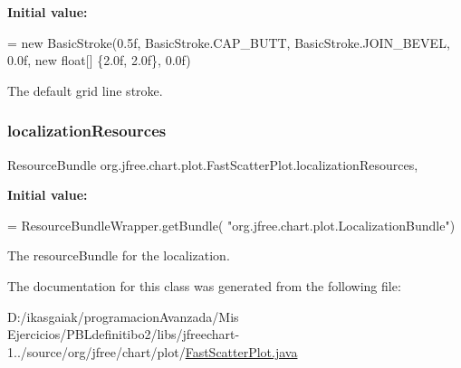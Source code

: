 {\bfseries Initial value\+:}
\begin{DoxyCode}
= \textcolor{keyword}{new} BasicStroke(0.5f,
            BasicStroke.CAP\_BUTT, BasicStroke.JOIN\_BEVEL, 0.0f, \textcolor{keyword}{new} \textcolor{keywordtype}{float}[]
            \{2.0f, 2.0f\}, 0.0f)
\end{DoxyCode}
The default grid line stroke. \mbox{\label{classorg_1_1jfree_1_1chart_1_1plot_1_1_fast_scatter_plot_a29311f97de98f3e475311380ec0ad4aa}} 
\subsubsection{\texorpdfstring{localization\+Resources}{localizationResources}}
{\footnotesize\ttfamily Resource\+Bundle org.\+jfree.\+chart.\+plot.\+Fast\+Scatter\+Plot.\+localization\+Resources\hspace{0.3cm}{\ttfamily [static]}, {\ttfamily [protected]}}

{\bfseries Initial value\+:}
\begin{DoxyCode}
= ResourceBundleWrapper.getBundle(
            \textcolor{stringliteral}{"org.jfree.chart.plot.LocalizationBundle"})
\end{DoxyCode}
The resource\+Bundle for the localization. 

The documentation for this class was generated from the following file\+:\begin{DoxyCompactItemize}
\item 
D\+:/ikasgaiak/programacion\+Avanzada/\+Mis Ejercicios/\+P\+B\+Ldefinitibo2/libs/jfreechart-\/1../source/org/jfree/chart/plot/\mbox{\hyperlink{_fast_scatter_plot_8java}{Fast\+Scatter\+Plot.\+java}}\end{DoxyCompactItemize}
